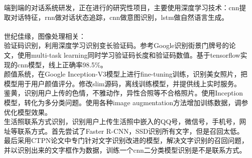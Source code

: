 \documentclass[11pt, a4paper]{article}
\begin{document}
端到端的对话系统研发，正在进行的研究性项目，主要使用深度学习技术：cnn提取对话特征，rnn做对话状态追踪，cnn做意图识别，lstm做自然语言生成。 \\
\\
世纪佳缘，图像处理相关： \\
验证码识别，利用深度学习识别变长验证码。参考Google识别街景门牌号的论文，使用multi-task learning同时学习验证码长度和验证码数值。基于tensorflow实现的cnn模型，线上正确率98.5\%。 \\
颜值系统，在Google Inception-V3模型上进行fine-tuning训练，识别美女照片，把模型用于用户颜值评分。修改slim源码，离线训练模型，并提供线上实时服务。 \\
鉴黄，识别用户上传的色情，不雅动作，异性合照等不合格照片。使用Inception模型，转化为多分类问题。使用各种image augmentation方法增加训练数据，调参优化模型效果。 \\
生活照联系方式识别，识别用户上传生活照中嵌入的QQ号，微信号，手机号，网址等联系方式。首先尝试了Faster R-CNN，SSD识别所有文字，但是召回太低。最后采用CTPN论文中专门针对文字识别改进的模型，解决文字识别的召回问题，并以识别出来的文字框作为数据，训练一个cnn二分类模型识别是不是联系方式。 \\












\end{document}

